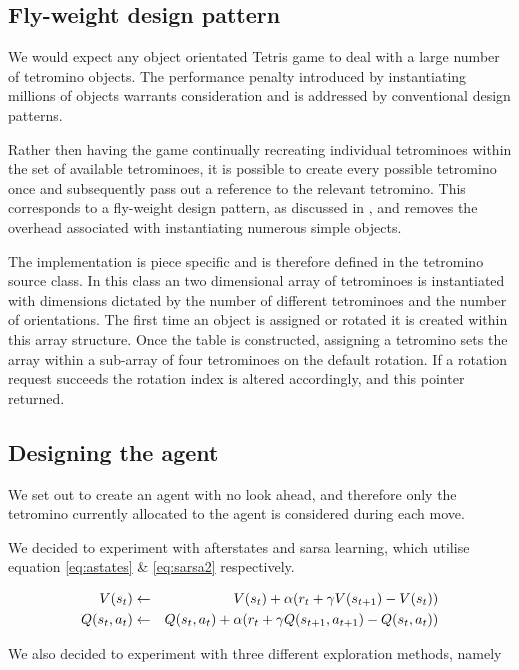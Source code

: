 \documentclass{rucsthesis}
\begin{document}
\subsection{Fly-weight design pattern}

We would expect any object orientated Tetris game to deal with a large number of tetromino objects. The performance penalty introduced by instantiating millions of objects warrants consideration and is addressed by conventional design patterns. 

Rather then having the game continually recreating individual tetrominoes within the set of available tetrominoes, it is possible to create every possible tetromino once and subsequently pass out a reference to the relevant tetromino. This corresponds to a fly-weight design pattern, as discussed in \cite{designp}, and removes the overhead associated with instantiating numerous simple objects.

The implementation is piece specific and is therefore defined in the tetromino source class. In this class an two dimensional array of tetrominoes is instantiated with dimensions dictated by the number of different tetrominoes and the number of orientations. The first time an object is assigned or rotated it is created within this array structure. Once the table is constructed, assigning a tetromino sets the array within a sub-array of four tetrominoes on the default rotation. If a rotation request succeeds the rotation index is altered accordingly, and this pointer returned.

\subsection{Designing the agent}

We set out to create an agent with no look ahead, and therefore only the tetromino currently allocated to the agent is considered during each move.

We decided to experiment with afterstates and sarsa learning, which utilise equation \ref{eq:astates} \& \ref{eq:sarsa2} respectively.

\begin{eqnarray}
\centering
V(s_t) & \leftarrow & V(s_t) + \alpha(r_{t} + \gamma V(s_{t+1}) - V(s_t)) \label{eq:astates} \\
Q(s_t,a_t) & \leftarrow & Q(s_t,a_t) + \alpha(r_{t} + \gamma Q(s_{t+1},a_{t+1}) - Q(s_t,a_t)) \label{eq:sarsa2}
\end{eqnarray}

We also decided to experiment with three different exploration methods, namely
\end{document}
